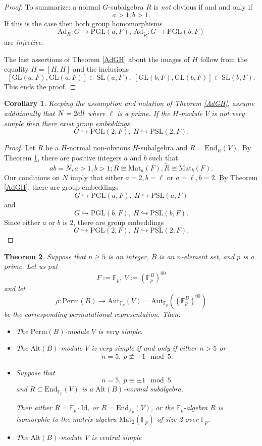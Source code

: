 \documentclass[12pt,a4paper,reqno]{amsart}
\def\F{{\mathbb F}}
\def\Perm{\mathrm{Perm}}
\def\Alt{\mathrm{Alt}}
\def\End{\mathrm{End}}
\def\Aut{\mathrm{Aut}}
\def\Mat{\mathrm{Mat}}
\def\Id{\mathrm{Id}}
\def\PGL{\mathrm{PGL}}
\newtheorem{thm}{Theorem}[section]
\newtheorem{cor}[thm]{Corollary}
\theoremstyle{definition}
\begin{document}
\begin{proof}
 To summarize: a normal $G$-subalgebra $R$ is {\sl not} obvious if and and only if 
 $$a>1,b>1.$$
  If this is the case then both group homomorphisms
 $$\mathrm{Ad}_R: G \to \PGL(a,F), \  \mathrm{Ad}_{\tilde{R}}: G \to \PGL(b,F)$$
 are {\sl injective}.  
 
 The last assertions of  Theorem \ref{AdGH} about the images of $H$ follow from the  equality $H=[H,H]$ and the inclusions
 $$[\mathrm{GL}(a,F), \mathrm{GL}(a,F)]\subset \mathrm{SL}(a,F), \ [\mathrm{GL}(b,F), \mathrm{GL}(b,F)]\subset \mathrm{SL}(b,F).$$
 This ends the proof.
\end{proof}

\begin{cor}
\label{AdGHcor}
Keeping the assumption and notation of Theorem \ref{AdGH}, assume additionally that $N=2\\ell$ where $\ell$ is a prime.
If the $H$-module $V$ is not very simple then there exist  group embeddings
$$G \hookrightarrow \mathrm{PGL}(2,F), \ H \hookrightarrow \mathrm{PSL}(2,F).$$
\end{cor}

\begin{proof}
Let $R$ be a $H$-normal non-obvious $H$-subalgebra  and $\tilde{R}=\End_R(V)$.  By Theorem \ref{AdGHcor},
there are positive integers $a$ and $b$ such that
$$ab=N, a>1, b>1; R \cong \Mat_a(F), \tilde{R} \cong \Mat_b(F).$$
Our conditions on $N$ imply  that either $a=2, b=\ell$ or $a=\ell, b=2$. By Theorem \ref{AdGH}, there are group embeddings
$$G \hookrightarrow \mathrm{PGL}(a,F), \ H \hookrightarrow \mathrm{PSL}(a,F)$$
and
$$G \hookrightarrow \mathrm{PGL}(b,F), \ H \hookrightarrow \mathrm{PSL}(b,F).$$
Since either $a$ or $b$ is $2$, there are group embeddings 
$$G \hookrightarrow \mathrm{PGL}(2,F), \ H \hookrightarrow \mathrm{PSL}(2,F).$$
\end{proof}




\begin{thm}
\label{A5}
Suppose that $n \ge 5$ is an integer, 
 $B$ is an $n$-element set, and $p$ is a prime.  Let us put
$$F:=\F_p, \ V:=\left(\F_p^{B}\right)^{00}$$
and let 
$$\rho: \Perm(B) \to \Aut_{\F_p}(V)=\Aut_{\F_p}\left(\left(\F_p^{B}\right)^{00}\right)$$
be the corresponding permutational representation.
 Then:
 \begin{itemize}
 \item[(i)]
The $\Perm(B)$-module $V$ is very simple.
 \item[(ii)]
The $\Alt(B)$-module $V$ is very simple if and only if  either $n>5$ or
$$n=5,  \ p \not\equiv \pm 1 \ \bmod 5.$$
\item[(iii)] Suppose that 
$$n=5, \ p \equiv \pm 1 \ \bmod 5.$$ 
and $R \subset \End_{\F_p}(V)$ is a $\Alt(B)$-normal subalgebra.


 Then either $R=\F_p\cdot \Id$, or $R=\End_{F_p}(V)$, or the $\F_p$-algebra $R$ is isomorphic to the matrix algebra 
 $\Mat_2(\F_p)$ of size 2 over $\F_p$.
 \item[(iv)]
 The $\Alt(B)$-module $V$ is central  simple
\end{itemize}
\end{thm}
\end{document}
